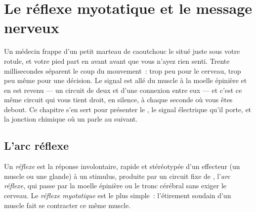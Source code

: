 \chapter{Le réflexe myotatique et le message nerveux}\label{ch:g12:stretch-reflex}

Un médecin frappe d'un petit marteau de caoutchouc le  situé
juste sous votre rotule, et votre pied part en avant avant que vous
n'ayez rien senti. Trente millisecondes séparent le coup du
mouvement~: trop peu pour le cerveau, trop peu même pour une décision.
Le signal est allé du muscle à la moelle épinière et en est
revenu --- un circuit de deux  et d'une connexion entre
eux --- et c'est ce même circuit qui vous tient droit, en silence, à
chaque seconde où vous êtes debout. Ce chapitre s'en sert pour
présenter le , le signal électrique qu'il porte, et la jonction
chimique où un  parle au suivant.

\section{L'arc réflexe}

\begin{definition}[Réflexe]\label{def:g12:stretch-reflex:reflex}
Un \emph{réflexe} est la réponse involontaire, rapide
et stéréotypée d'un effecteur (un muscle ou une glande) à un stimulus,
produite par un circuit fixe de , l'\emph{arc
réflexe}, qui passe par la moelle épinière ou le
tronc cérébral sans exiger le cerveau. Le \emph{réflexe
myotatique} est le plus simple~: l'étirement
soudain d'un muscle fait se contracter ce même muscle.
\end{definition}

